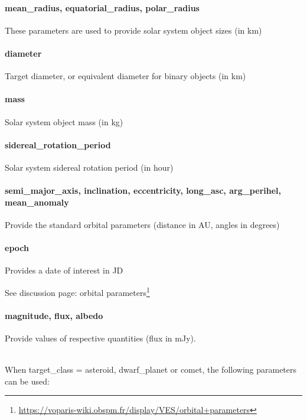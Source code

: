 \documentclass[11pt,a4paper]{ivoa}
\begin{document}
\paragraph{mean\_radius, equatorial\_radius, polar\_radius}

These parameters are used to provide solar system object sizes (in km)

\paragraph{diameter}

Target diameter, or equivalent diameter for binary objects (in km)

\paragraph{mass}

Solar system object mass (in kg)

\paragraph{sidereal\_rotation\_period}

Solar system sidereal rotation period (in hour)

\paragraph{semi\_major\_axis, inclination, eccentricity, long\_asc, arg\_perihel, mean\_anomaly}

Provide the standard orbital parameters (distance in AU, angles in degrees)

\paragraph{epoch}

Provides a date of interest in JD

See discussion page: orbital
parameters\footnote{\url{https://voparis-wiki.obspm.fr/display/VES/orbital+parameters}}

\paragraph{magnitude, flux, albedo}
Provide values of respective quantities (flux in mJy).



\textbf{\\}When target\_class = asteroid, dwarf\_planet or comet,
the following parameters can be used:
\end{document}
